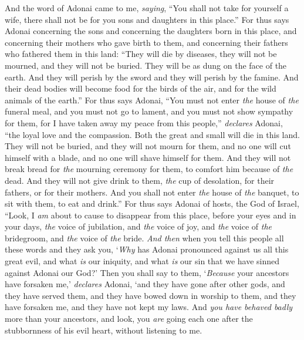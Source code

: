 \begin{biblechapter} %
 And the word of Adonai came to me, \textit{saying},
\verse “You shall not take for yourself a wife, there shall not be for you sons and daughters in this place.”
\verse For thus says Adonai concerning the sons and concerning the daughters born in this place, and concerning their mothers who gave birth to them, and concerning their fathers who fathered them in this land:
\verse “They will die by diseases, they will not be mourned, and they will not be buried. They will be as dung on the face of the earth. And they will perish by the sword and they will perish by the famine. And their dead bodies will become food for the birds of the air, and for the wild animals of the earth.”
\verse For thus says Adonai, “You must not enter \textit{the} house of \textit{the} funeral meal, and you must not go to lament, and you must not show sympathy for them, for I have taken away my peace from this people,” \textit{declares} Adonai, “the loyal love and the compassion.
\verse Both the great and small will die in this land. They will not be buried, and they will not mourn for them, and no one will cut himself with a blade, and no one will shave himself for them.
\verse And they will not break bread for \textit{the} mourning ceremony for them, to comfort him because of \textit{the} dead. And they will not give drink to them, \textit{the} cup of desolation, for their fathers, or for their mothers.
\verse And you shall not enter \textit{the} house of \textit{the} banquet, to sit with them, to eat and drink.”
\verse For thus says Adonai of hosts, the God of Israel, “Look, I \textit{am} about to cause to disappear from this place, before your eyes and in your days, \textit{the} voice of jubilation, and \textit{the} voice of joy, and \textit{the} voice of \textit{the} bridegroom, and \textit{the} voice of \textit{the} bride.
\verse \textit{And then} when you tell this people all these words and they ask you, ‘\textit{Why} has Adonai pronounced against us all this great evil, and what \textit{is} our iniquity, and what \textit{is} our sin that we have sinned against Adonai our God?’
\verse Then you shall say to them, ‘\textit{Because} your ancestors have forsaken me,’ \textit{declares} Adonai, ‘and they have gone after other gods, and they have served them, and they have bowed down in worship to them, and they have forsaken me, and they have not kept my laws.
\verse And \textit{you have behaved badly} more than your ancestors, and look, you \textit{are} going each one after the stubbornness of his evil heart, without listening to me.

\end{biblechapter}
